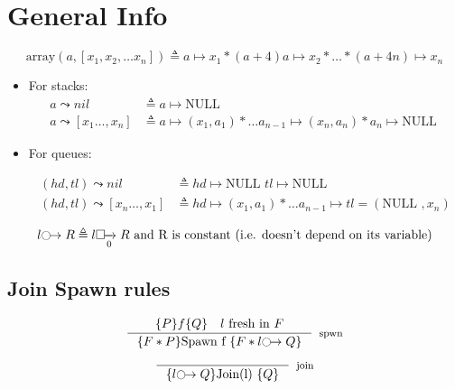 \documentclass[8pt]{article}
\newcommand{\arr}{\text{array}}
\newcommand{\lock}[2]{ \square \hspace{-1ex} \xrightarrow[#1]{#2}}
\newcommand{\thread}{\ocircle \hspace{-1ex} \rightarrow}
\newcommand{\NULL}{\text{NULL }}
\begin{document}
\section{General Info}
$$ \arr (a, [x_1, x_2, \dots x_n]) \triangleq a \mapsto x_1 \ast (a + 4) a \mapsto x_2 \ast \dots \ast (a +4n) \mapsto x_n$$
\begin{itemize}
\item For stacks:
\begin{align*}
 a \leadsto nil & \triangleq a \mapsto \NULL \\
 a \leadsto [x_1 \dots, x_{n}] &\triangleq a \mapsto (x_1, a_1) \ast \dots a_{n-1} \mapsto (x_n, a_n)\ast a_n\mapsto \NULL
 \end{align*}
\item For queues:

\begin{align*} 
(hd, tl) \leadsto nil  &\triangleq hd \mapsto \NULL tl \mapsto \NULL \\
 (hd, tl) \leadsto [x_n \dots, x_{1}] &\triangleq hd \mapsto (x_1, a_1) \ast \dots a_{n-1} \mapsto tl=(\NULL,x_n) 
\end{align*}

\end{itemize}

$$l \thread R  \triangleq l \lock{0}{} R \text{ and R is constant (i.e. doesn't depend on its variable)} $$

\subsection{Join Spawn rules}

$$ \inference {\{P\} f \{Q\}  \quad \text{$l$ fresh in $F$}   }{\{F \ast P\} \text{Spawn f } \{F \ast l  \thread Q \}}[spwn]$$

$$ \inference { }{\{ l  \thread Q \} \text{Join(l) } \{ Q \}}[join]$$
\end{document}
